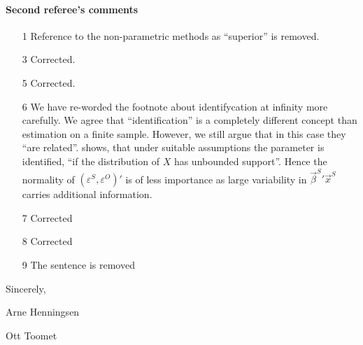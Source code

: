 \documentclass[a4paper]{article}
\begin{document}
\paragraph{Second referee's comments}

\begin{itemize}
\item[1] Reference to the non-parametric methods as ``superior'' is
  removed.
\item[3] Corrected.
\item[5] Corrected.
\item[6] We have re-worded the footnote about identifycation at
  infinity more carefully.  We agree that ``identification'' is a
  completely different concept than estimation on a finite sample.
  However, we still argue that in this case they ``are related''.
  \cite[p. 205]{chamberlain1986} shows, that under suitable
  assumptions the parameter is identified, ``if the distribution of
  $X$ has unbounded support''.  Hence the normality of
  $(\varepsilon^{S}, \varepsilon^{O})'$ is of less importance as large
  variability in ${\vec{\beta}^{S}}' \vec{x}^{S}$ carries additional
  information.
\item[7] Corrected
\item[8] Corrected
\item[9] The sentence is removed
\end{itemize}

\bigskip

Sincerely,

\bigskip

Arne Henningsen

Ott Toomet



\end{document}
